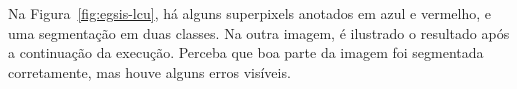 \begin{figure}[!h]
\centering
    \captionsetup{width=14cm}

    \begin{subfigure}[b]{0.45\textwidth}
    \centering
    \caption{\label{fig:egsis-superpixels}}
    \end{subfigure}
\quad
    \begin{subfigure}[b]{0.45\textwidth}
    \centering
    \caption{\label{fig:egsis-complex-networks}}
    \end{subfigure}
    {\Fonte{\fonteautorscikit}}
\quad
\end{figure}
\FloatBarrier{}



Na Figura~\ref{fig:egsis-lcu}, há alguns superpixels
anotados em azul e vermelho, e uma segmentação em duas classes. Na outra
imagem, é ilustrado o resultado após a continuação da
execução. Perceba que boa parte da imagem foi segmentada corretamente, mas houve
alguns erros visíveis.

